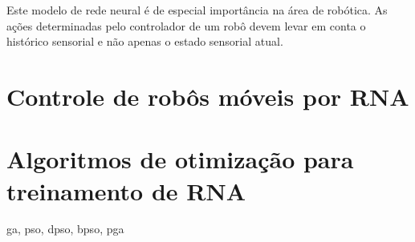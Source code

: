 Este modelo de rede neural é de especial importância na área de robótica. As ações determinadas pelo controlador de um robô devem levar em conta o histórico sensorial e não apenas o estado sensorial atual.

\section{Controle de robôs móveis por RNA}



\section{Algoritmos de otimização para treinamento de RNA}
\label{optimization-algorithms}

ga, pso, dpso, bpso, pga